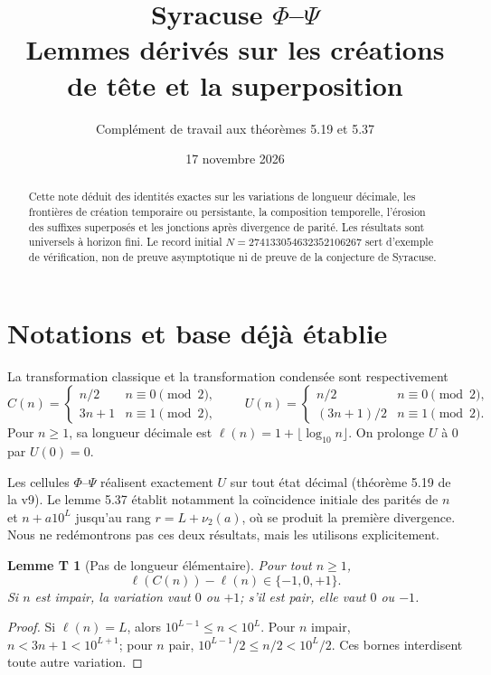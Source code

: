 \documentclass[11pt,a4paper]{article}
\title{Syracuse $\Phi$--$\Psi$\\Lemmes dérivés sur les créations de tête et la superposition}
\author{Complément de travail aux théorèmes 5.19 et 5.37}
\date{17 novembre 2026}
\newtheorem{lemme}{Lemme T}
\newcommand{\ellg}{\ell}
\begin{document}
\maketitle
\begin{abstract}
Cette note déduit des identités exactes sur les variations de longueur décimale,
les frontières de création temporaire ou persistante, la composition temporelle,
l'érosion des suffixes superposés et les jonctions après divergence de parité.
Les résultats sont universels à horizon fini. Le record initial
$N=274133054632352106267$ sert d'exemple de vérification, non de preuve
asymptotique ni de preuve de la conjecture de Syracuse.
\end{abstract}

\section*{Notations et base déjà établie}
La transformation classique et la transformation condensée sont respectivement
\[
C(n)=\begin{cases}n/2&n\equiv0\pmod2,\\3n+1&n\equiv1\pmod2,\end{cases}
\qquad
U(n)=\begin{cases}n/2&n\equiv0\pmod2,\\(3n+1)/2&n\equiv1\pmod2.\end{cases}
\]
Pour $n\ge1$, sa longueur décimale est $\ellg(n)=1+\lfloor\log_{10}n\rfloor$.
On prolonge $U$ à $0$ par $U(0)=0$.\par
Les cellules $\Phi$--$\Psi$ réalisent exactement $U$ sur tout état décimal
(théorème 5.19 de la v9). Le lemme 5.37 établit notamment la coïncidence
initiale des parités de $n$ et $n+a10^L$ jusqu'au rang
$r=L+\nu_2(a)$, où se produit la première divergence. Nous ne redémontrons
pas ces deux résultats, mais les utilisons explicitement.

\begin{lemme}[Pas de longueur élémentaire]
Pour tout $n\ge1$,
\[
\ellg(C(n))-\ellg(n)\in\{-1,0,+1\}.
\]
Si $n$ est impair, la variation vaut $0$ ou $+1$; s'il est pair,
elle vaut $0$ ou $-1$.
\end{lemme}
\begin{proof}
Si $\ellg(n)=L$, alors $10^{L-1}\le n<10^L$.
Pour $n$ impair, $n<3n+1<10^{L+1}$; pour $n$ pair,
$10^{L-1}/2\le n/2<10^L/2$. Ces bornes interdisent toute autre variation.
\end{proof}
\end{document}
